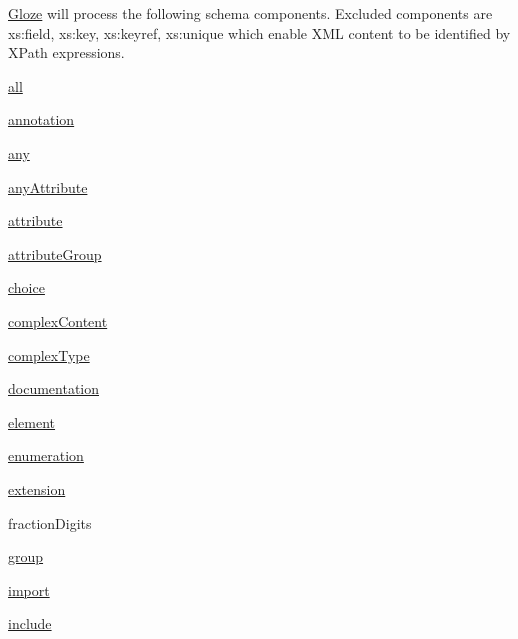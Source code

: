\hyperlink{classcom_1_1hp_1_1gloze_1_1_gloze}{Gloze} will process the following schema components. Excluded components are xs:field, xs:key, xs:keyref, xs:unique which enable XML content to be identified by XPath expressions.


\begin{DoxyItemize}
\item \hyperlink{all}{all}
\item \hyperlink{annotation}{annotation}
\item \hyperlink{any}{any}
\item \hyperlink{anyattribute}{anyAttribute}
\item \hyperlink{attribute}{attribute}
\item \hyperlink{attributegroup}{attributeGroup}
\end{DoxyItemize}


\begin{DoxyItemize}
\item \hyperlink{choice}{choice}
\item \hyperlink{complexcontent}{complexContent}
\item \hyperlink{complextype}{complexType}
\end{DoxyItemize}


\begin{DoxyItemize}
\item \hyperlink{documentation}{documentation}
\end{DoxyItemize}


\begin{DoxyItemize}
\item \hyperlink{element}{element}
\item \hyperlink{enumeration}{enumeration}
\item \hyperlink{extension}{extension}
\end{DoxyItemize}


\begin{DoxyItemize}
\item fractionDigits
\end{DoxyItemize}


\begin{DoxyItemize}
\item \hyperlink{group}{group}
\end{DoxyItemize}


\begin{DoxyItemize}
\item \hyperlink{import}{import}
\item \hyperlink{include}{include}
\end{DoxyItemize}


